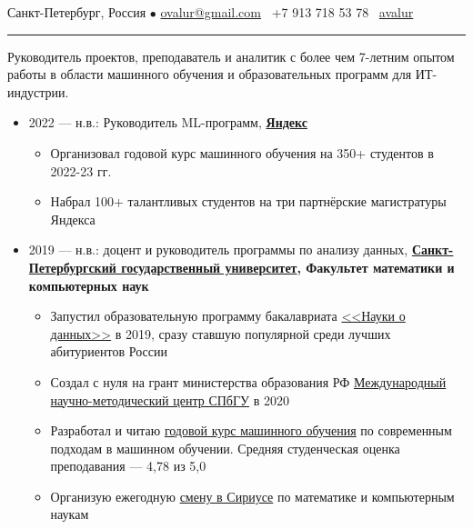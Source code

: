 \documentclass[11pt]{article}
\begin{document}
%

\vspace{0.5em}

\noindent Санкт-Петербург, Россия $\bullet$ \href{mailto:ovalur@gmail.com}{ovalur@gmail.com} \faMobile~+7 913 718 53 78
\faGithub~\href{https://github.com/avalur}{avalur}

\vspace{0.5em}
\hrule
\vspace{0.5em}

Руководитель проектов, преподаватель и аналитик с более чем 7-летним опытом работы в области машинного обучения и образовательных программ для ИТ-индустрии.

\vspace{0.5em}
\begin{itemize}
	\item 2022 — н.в.:
	Руководитель ML-программ, \textbf{\href{https://yandex.ru}{Яндекс}}
	\begin{itemize}
		\item Организовал годовой курс машинного обучения на 350+ студентов в 2022-23 гг.
		\item Набрал 100+ талантливых студентов на три партнёрские магистратуры Яндекса
	\end{itemize}

	\item 2019 — н.в.: доцент и руководитель программы по анализу данных, \textbf{\href{https://spbu.ru}{Санкт-Петербургский государственный университет}, Факультет математики и компьютерных наук}

	\begin{itemize}
		\item Запустил образовательную программу бакалавриата \href{https://maad.compscicenter.ru}{<<Науки о данных>>} в 2019, сразу ставшую популярной среди лучших абитуриентов России
		\item Создал с нуля на грант министерства образования РФ \href{https://gsom.spbu.ru/all_news/event2021-02-04/}{Международный научно-методический центр СПбГУ} в 2020
		\item Разработал и читаю \href{https://github.com/spbu-math-cs/ml-course/}{годовой курс машинного обучения} по современным подходам в машинном обучении. Средняя студенческая оценка преподавания — 4,78 из 5,0
		\item Организую ежегодную \href{https://sochisirius.ru/obuchenie/nauka/smena1078/5204}{смену в Сириусе} по математике и компьютерным наукам
	\end{itemize}


\end{itemize}
\end{document}
